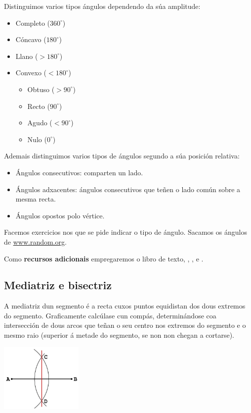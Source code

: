 Distinguimos varios tipos ángulos dependendo da súa amplitude:
\begin{itemize}
    \item Completo ($360^{\circ}$)
    \item Cóncavo ($180^{\circ}$)
    \item Llano ($> 180^{\circ}$)
    \item Convexo ($< 180^{\circ}$)
        \begin{itemize}
            \item Obtuso ($> 90^{\circ}$)
            \item Recto ($90^{\circ}$)
            \item Agudo ($< 90^{\circ}$)
            \item Nulo ($0^{\circ}$)
        \end{itemize}
\end{itemize}

Ademais distinguimos varios tipos de ángulos segundo a súa posición relativa:

\begin{itemize}
    \item Ángulos consecutivos: comparten un lado.
    \item Ángulos adxacentes: ángulos consecutivos que teñen o lado común sobre a mesma recta.
    \item Ángulos opostos polo vértice.
\end{itemize}

Facemos exercicios nos que se pide indicar o tipo de ángulo. Sacamos os ángulos de \href{https://www.random.org}{www.random.org}.

Como \textbf{recursos adicionais} empregaremos o libro de texto, \cite{wiki:angulos}, \cite{yt:angulostriangulos}, \cite{yt:sumarestasexagesimal} e \cite{yt:sumaresta}.

\subsection{Mediatriz e bisectriz}

A mediatriz dun segmento é a recta cuxos puntos equidistan dos dous extremos do segmento. Graficamente calcúlase cun compás, determinándose coa intersección de dous arcos que teñan o seu centro nos extremos do segmento e o mesmo raio (superior á metade do segmento, se non non chegan a cortarse).

\begin{center}
    \includegraphics[width=0.3\textwidth]{img/mediatriz.jpg}
\end{center}

